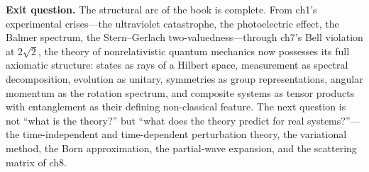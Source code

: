 \medskip\noindent\textbf{Exit question.}
The structural arc of the book is complete. From ch1's experimental crises---the ultraviolet catastrophe, the photoelectric effect, the Balmer spectrum, the Stern--Gerlach two-valuedness---through ch7's Bell violation at $2\sqrt{2}$, the theory of nonrelativistic quantum mechanics now possesses its full axiomatic structure: states as rays of a Hilbert space, measurement as spectral decomposition, evolution as unitary, symmetries as group representations, angular momentum as the rotation spectrum, and composite systems as tensor products with entanglement as their defining non-classical feature. The next question is not ``what is the theory?'' but ``what does the theory predict for real systems?''---the time-independent and time-dependent perturbation theory, the variational method, the Born approximation, the partial-wave expansion, and the scattering matrix of ch8.
